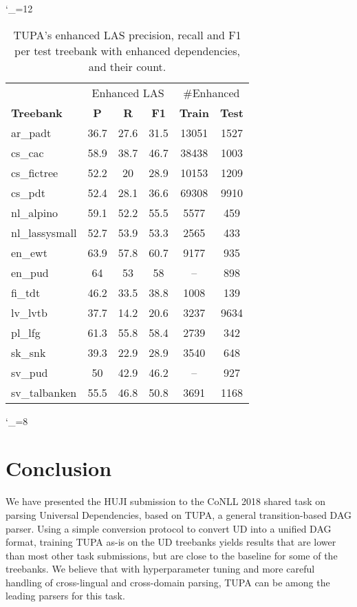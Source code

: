 \documentclass[11pt,a4paper]{article}
\begin{document}
\catcode`\_=12
\begin{table}
\begin{tabular}{l|ccc|cc}
\hline
& \multicolumn{3}{c|}{Enhanced LAS} & \multicolumn{2}{c}{\#Enhanced} \\
\bf Treebank & \bf P & \bf R & \bf F1 & \bf Train & \bf Test \\
\hline
\small ar_padt       & 36.7&27.6&31.5 & 13051 & 1527\\
\small cs_cac        & 58.9&38.7&46.7 & 38438 & 1003\\
\small cs_fictree    & 52.2&20&28.9 & 10153 & 1209\\
\small cs_pdt        & 52.4&28.1&36.6 & 69308 & 9910\\
\small nl_alpino     & 59.1&52.2&55.5 & 5577 & 459\\
\small nl_lassysmall & 52.7&53.9&53.3 & 2565 & 433\\
\small en_ewt        & 63.9&57.8&60.7 & 9177 & 935\\
\small en_pud        & 64&53&58 & -- & 898\\
\small fi_tdt        & 46.2&33.5&38.8 & 1008 & 139\\
\small lv_lvtb       & 37.7&14.2&20.6 & 3237 & 9634\\
\small pl_lfg        & 61.3&55.8&58.4 & 2739 & 342\\
\small sk_snk        & 39.3&22.9&28.9 & 3540 & 648\\
\small sv_pud        & 50&42.9&46.2 & -- & 927\\
\small sv_talbanken  & 55.5&46.8&50.8 & 3691 & 1168\\
\end{tabular}
\caption{TUPA's enhanced LAS precision, recall and F1 per test treebank with enhanced dependencies,
and their count.
\label{tab:enhanced}}
\end{table}
\catcode`\_=8


\section{Conclusion}\label{sec:conclusion}

We have presented the HUJI submission to the CoNLL 2018 shared task on parsing Universal Dependencies, based on TUPA, a general transition-based DAG parser.
Using a simple conversion protocol to convert UD into a unified DAG format,
training TUPA as-is on the UD treebanks yields results that are lower than
most other task submissions, but are close to the baseline for some of the treebanks.
We believe that with hyperparameter tuning and more careful handling of
cross-lingual and cross-domain parsing, TUPA can be among the leading parsers for this task.
\end{document}
